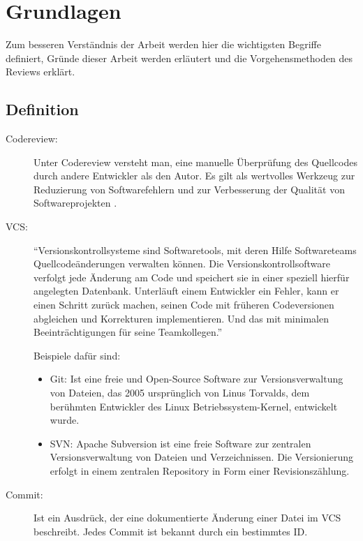\section{Grundlagen}
\label{sec:Grundlagen}

Zum besseren Verständnis der Arbeit werden hier die wichtigsten Begriffe definiert, Gründe dieser Arbeit werden erläutert und die Vorgehensmethoden des Reviews erklärt.

\subsection{Definition}
\label{subsec:Definition}

\begin{description}
	\item [Codereview:]
		Unter Codereview versteht man, eine manuelle Überprüfung des Quellcodes durch andere Entwickler als den Autor. Es gilt als wertvolles Werkzeug zur Reduzierung von 							Softwarefehlern und zur Verbesserung der Qualität von Softwareprojekten \cite{bacchelli2013expectations}.

	\item [\ac{VCS}:]
		"`Versionskontrollsysteme sind Softwaretools, mit deren Hilfe Softwareteams Quellcodeänderungen verwalten können. Die Versionskontrollsoftware verfolgt jede Änderung am Code und 		speichert sie in einer speziell hierfür angelegten Datenbank. Unterläuft einem Entwickler ein Fehler, kann er einen Schritt zurück machen, seinen Code mit früheren Codeversionen 		abgleichen und Korrekturen implementieren. Und das mit minimalen Beeinträchtigungen für seine Teamkollegen."' \cite{version-control-System}
		
		Beispiele dafür sind:
		\begin{itemize}
			\item Git: Ist eine freie und Open-Source Software zur Versionsverwaltung von Dateien, das 2005 ursprünglich von Linus Torvalds, dem berühmten Entwickler des Linux 						Betriebssystem-Kernel, entwickelt wurde.
			\item SVN: Apache Subversion ist eine freie Software zur zentralen Versionsverwaltung von Dateien und Verzeichnissen. Die Versionierung erfolgt in einem zentralen Repository 			in Form einer Revisionszählung.
		\end{itemize}
	
	\item[Commit:] Ist ein Ausdrück, der eine dokumentierte Änderung einer Datei im \ac{VCS} beschreibt. Jedes Commit ist bekannt durch ein bestimmtes ID.
	

\end{description}
